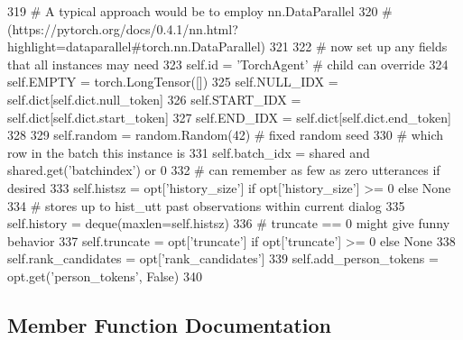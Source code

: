 \begin{DoxyCode}
319             \textcolor{comment}{# A typical approach would be to employ nn.DataParallel}
320             \textcolor{comment}{# (https://pytorch.org/docs/0.4.1/nn.html?highlight=dataparallel#torch.nn.DataParallel)}
321 
322         \textcolor{comment}{# now set up any fields that all instances may need}
323         self.id = \textcolor{stringliteral}{'TorchAgent'}  \textcolor{comment}{# child can override}
324         self.EMPTY = torch.LongTensor([])
325         self.NULL\_IDX = self.dict[self.dict.null\_token]
326         self.START\_IDX = self.dict[self.dict.start\_token]
327         self.END\_IDX = self.dict[self.dict.end\_token]
328 
329         self.random = random.Random(42)  \textcolor{comment}{# fixed random seed}
330         \textcolor{comment}{# which row in the batch this instance is}
331         self.batch\_idx = shared \textcolor{keywordflow}{and} shared.get(\textcolor{stringliteral}{'batchindex'}) \textcolor{keywordflow}{or} 0
332         \textcolor{comment}{# can remember as few as zero utterances if desired}
333         self.histsz = opt[\textcolor{stringliteral}{'history\_size'}] \textcolor{keywordflow}{if} opt[\textcolor{stringliteral}{'history\_size'}] >= 0 \textcolor{keywordflow}{else} \textcolor{keywordtype}{None}
334         \textcolor{comment}{# stores up to hist\_utt past observations within current dialog}
335         self.history = deque(maxlen=self.histsz)
336         \textcolor{comment}{# truncate == 0 might give funny behavior}
337         self.truncate = opt[\textcolor{stringliteral}{'truncate'}] \textcolor{keywordflow}{if} opt[\textcolor{stringliteral}{'truncate'}] >= 0 \textcolor{keywordflow}{else} \textcolor{keywordtype}{None}
338         self.rank\_candidates = opt[\textcolor{stringliteral}{'rank\_candidates'}]
339         self.add\_person\_tokens = opt.get(\textcolor{stringliteral}{'person\_tokens'}, \textcolor{keyword}{False})
340 
\end{DoxyCode}


\subsection{Member Function Documentation}
\mbox{\label{classparlai_1_1agents_1_1legacy__agents_1_1seq2seq_1_1torch__agent__v1_1_1TorchAgent_a3ab251071823f34358a569c1c2a11bf9}} 
